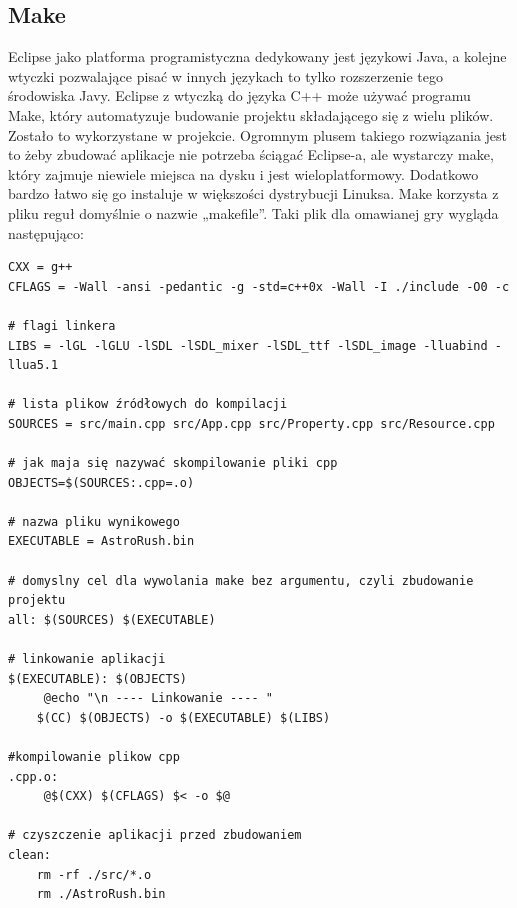 \subsection{Make}
Eclipse jako platforma programistyczna dedykowany jest językowi Java, a kolejne wtyczki pozwalające pisać w innych językach to tylko rozszerzenie tego
środowiska Javy. Eclipse z wtyczką do języka C++ może używać programu Make, który automatyzuje budowanie projektu składającego się z wielu plików.  
Zostało to wykorzystane w projekcie. Ogromnym plusem takiego rozwiązania jest to żeby zbudować aplikacje nie potrzeba ściągać Eclipse-a, ale wystarczy
make, który zajmuje niewiele miejsca na dysku i jest wieloplatformowy. Dodatkowo bardzo łatwo się go instaluje w większości dystrybucji Linuksa. Make
korzysta z pliku reguł domyślnie o nazwie „makefile”. Taki plik dla omawianej gry wygląda następująco:

\begingroup
\fontsize{10pt}{12pt}\selectfont
\begin{verbatim}  
CXX = g++
CFLAGS = -Wall -ansi -pedantic -g -std=c++0x -Wall -I ./include -O0 -c

# flagi linkera
LIBS = -lGL -lGLU -lSDL -lSDL_mixer -lSDL_ttf -lSDL_image -lluabind -llua5.1

# lista plikow źródłowych do kompilacji
SOURCES = src/main.cpp src/App.cpp src/Property.cpp src/Resource.cpp 

# jak maja się nazywać skompilowanie pliki cpp
OBJECTS=$(SOURCES:.cpp=.o)

# nazwa pliku wynikowego
EXECUTABLE = AstroRush.bin

# domyslny cel dla wywolania make bez argumentu, czyli zbudowanie projektu
all: $(SOURCES) $(EXECUTABLE)

# linkowanie aplikacji
$(EXECUTABLE): $(OBJECTS)
	 @echo "\n ---- Linkowanie ---- "
	$(CC) $(OBJECTS) -o $(EXECUTABLE) $(LIBS)

#kompilowanie plikow cpp
.cpp.o:
	 @$(CXX) $(CFLAGS) $< -o $@

# czyszczenie aplikacji przed zbudowaniem  
clean:
	rm -rf ./src/*.o
	rm ./AstroRush.bin 
    \end{verbatim}  
\endgroup

